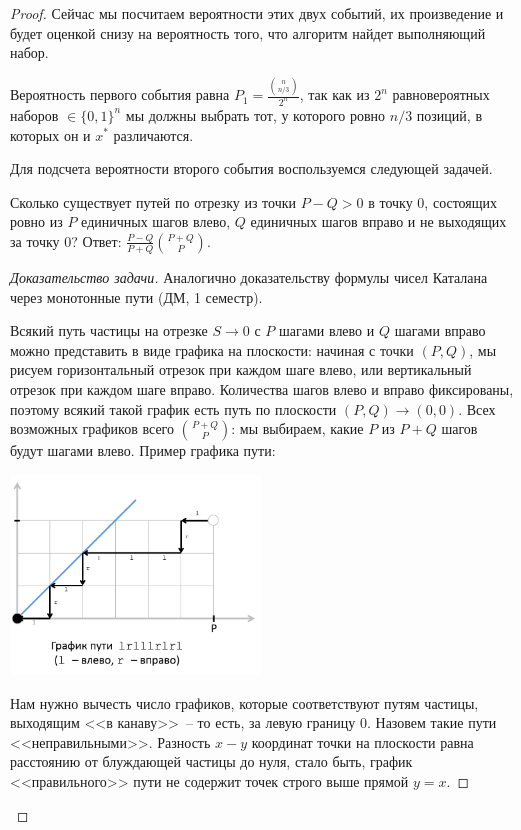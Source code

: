 \begin{proof}
Сейчас мы посчитаем вероятности этих двух событий, их произведение и будет оценкой снизу на вероятность того, что алгоритм найдет выполняющий набор.

Вероятность первого события равна $P_1 = \frac{{n\choose{n/3}}}{2^n}$, так как из $2^n$ равновероятных наборов $\in \{0, 1\}^n$ мы должны выбрать тот, у которого ровно $n/3$ позиций, в которых он и $x^*$ различаются.

Для подсчета вероятности второго события воспользуемся следующей задачей.

\begin{theorem*}
	Сколько существует путей по отрезку из точки $P-Q>0$ в точку $0$, состоящих ровно из $P$ единичных шагов влево, $Q$ единичных шагов вправо и не выходящих за точку 0? Ответ: $\frac{P-Q}{P+Q} {P+Q\choose P}$.
\end{theorem*}
\begin{proof}[Доказательство задачи]
	Аналогично доказательству формулы чисел Каталана через монотонные пути (ДМ, 1 семестр).

	Всякий путь частицы на отрезке $S \rightarrow 0$ с $P$ шагами влево и $Q$ шагами вправо можно представить в виде графика на плоскости: начиная с точки $(P, Q)$, мы рисуем горизонтальный отрезок при каждом шаге влево, или вертикальный отрезок при каждом шаге вправо. Количества шагов влево и вправо фиксированы, поэтому всякий такой график есть путь по плоскости $(P, Q) \rightarrow (0, 0)$. Всех возможных графиков всего ${P+Q \choose P}$: мы выбираем, какие $P$ из $P+Q$ шагов будут шагами влево. Пример графика пути:

	\begin{center}
		\includegraphics[width=0.5\textwidth]{figures/path1.png}
	\end{center}

	Нам нужно вычесть число графиков, которые соответствуют путям частицы, выходящим <<в канаву>>~-- то есть, за левую границу 0. Назовем такие пути <<неправильными>>. Разность $x-y$ координат точки на плоскости равна расстоянию от блуждающей частицы до нуля, стало быть, график <<правильного>> пути не содержит точек строго выше прямой $y=x$.


\end{proof}
\end{proof}

